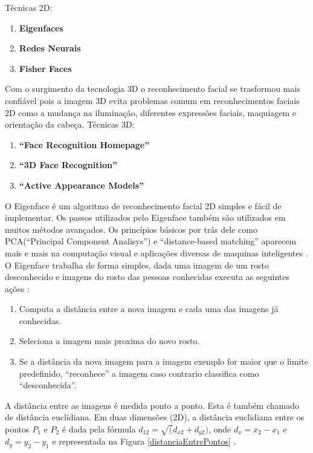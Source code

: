 	Técnicas 2D:
	\begin{enumerate}
		\item \textbf{Eigenfaces}
		\item \textbf{Redes Neurais}
		\item \textbf{Fisher Faces}
	\end{enumerate}

Com o surgimento da tecnologia 3D o reconhecimento facial se trasformou mais confiável pois a imagem 3D evita problemas comum em reconhecimentos faciais 2D como a mudança na iluminação, diferentes expressões faciais, maquiagem e orientação da cabeça.
	Técnicas 3D:
	\begin{enumerate}
		\item \textbf{``Face Recognition Homepage''}
		\item \textbf{``3D Face Recognition''}
		\item \textbf{``Active Appearance Models''}
	\end{enumerate}


O Eigenface é um algoritmo de reconhecimento facial 2D simples e fácil de implementar. Os passos utilizados pelo Eigenface também são utilizados em muitos métodos avançados. Os princípios básicos por trás dele como PCA(``Principal Component Analisys'') e ``distance-based matching'' aparecem mais e mais na computação visual e aplicações diversas de maquinas inteligentes \cite{hewitt}.
O Eigenface trabalha de forma simples, dada uma imagem de um rosto desconhecido e imagens do rosto das pessoas conhecidas executa as seguintes ações \cite{hewitt}:
	\begin{enumerate}
		\item Computa a distância entre a nova imagem e cada uma das imagens já conhecidas.
		\item Seleciona a imagem mais proxima do novo rosto.
		\item Se a distância da nova imagem para a imagem exemplo for maior que o limite predefinido, ``reconhece'' a imagem caso contrario classifica como ``desconhecida''.
	\end{enumerate}


A distância entre as imagens é medida ponto a ponto. Esta é também chamado de distância euclidiana. Em duas dimensões (2D), a distância euclidiana entre os pontos $P_1$ e $P_2$ é dada pela fórmula $\displaystyle d_{12} = \sqrt(d_{x2} + d_{y2})$, onde $\displaystyle d_x = x_2 - x_1$ e $\displaystyle d_y = y_2-y_1$ e representada na Figura \ref{distanciaEntrePontos} \cite{hewitt}.

